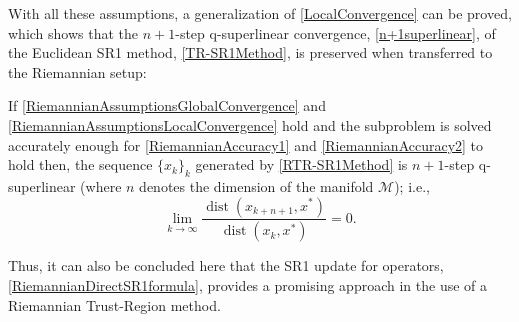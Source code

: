 With all these assumptions, a generalization of \cref{LocalConvergence} can be proved, which shows that the $n + 1$-step q-superlinear convergence, \cref{n+1superlinear}, of the Euclidean SR1 method, \cref{TR-SR1Method}, is preserved when transferred to the Riemannian setup: 
\begin{theorem} \label{RiemannianLocalConvergence}
    If \cref{RiemannianAssumptionsGlobalConvergence} and \cref{RiemannianAssumptionsLocalConvergence} hold and the subproblem is solved accurately enough for \cref{RiemannianAccuracy1} and \cref{RiemannianAccuracy2} to hold then, the sequence $\{ x_k \}_k$ generated by \cref{RTR-SR1Method} is $n + 1$-step q-superlinear (where $n$ denotes the dimension of the manifold $\mathcal{M}$); i.e.,
    \begin{equation*}
        \lim_{k \rightarrow \infty} \frac{\operatorname{dist}(x_{k+n+1}, x^*)}{\operatorname{dist}(x_k, x^*)} = 0.
    \end{equation*}
\end{theorem}
Thus, it can also be concluded here that the SR1 update for operators, \cref{RiemannianDirectSR1formula}, provides a promising approach in the use of a Riemannian Trust-Region method.


